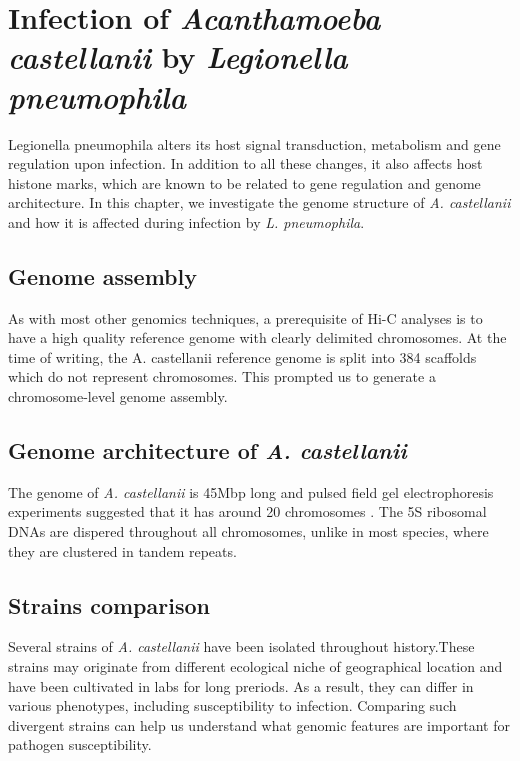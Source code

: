 
\chapter{Infection of \textit{Acanthamoeba castellanii} by \textit{Legionella pneumophila}} %

\label{ch:02-02} %


Legionella pneumophila alters its host signal transduction, metabolism and gene regulation upon infection. In addition to all these changes, it also affects host histone marks, which are known to be related to gene regulation and genome architecture. In this chapter, we investigate the genome structure of \textit{A. castellanii} and how it is affected during infection by \textit{L. pneumophila}.

\section{Genome assembly}

As with most other genomics techniques, a prerequisite of Hi-C analyses is to have a high quality reference genome with clearly delimited chromosomes. At the time of writing, the A. castellanii reference genome is split into 384 scaffolds which do not represent chromosomes. This prompted us to generate a chromosome-level genome assembly.

\section{Genome architecture of \textit{A. castellanii}}

The genome of \textit{A. castellanii} is 45Mbp long and pulsed field gel electrophoresis experiments suggested that it has around 20 chromosomes \cite{rimmResolutionAcanthamoebaCastellanii1988}. The 5S ribosomal DNAs are dispered throughout all chromosomes, unlike in most species, where they are clustered in tandem repeats.

\section{Strains comparison}

Several strains of \textit{A. castellanii} have been isolated throughout history.These strains may originate from different ecological niche of geographical location and have been cultivated in labs for long preriods. As a result, they can differ in various phenotypes, including susceptibility to infection. Comparing such divergent strains can help us understand what genomic features are important for pathogen susceptibility.


